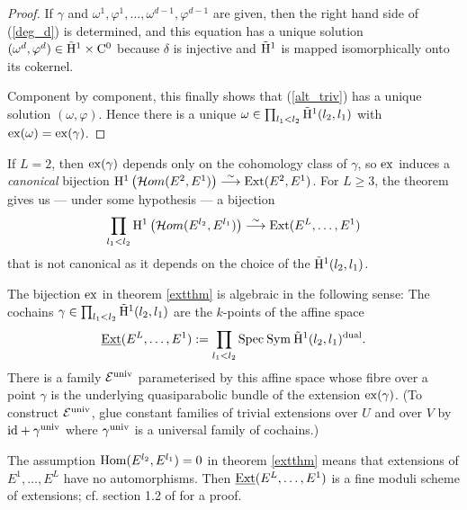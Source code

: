 \documentclass{article}
\begin{document}
\begin{proof}
  If $\gamma$ and $\omega^1, \varphi^1, \ldots, \omega^{d-1}, \varphi^{d-1}$ are given, then the right hand side of (\ref{deg_d}) is determined, and this
  equation has a unique solution $(\omega^d, \varphi^d) \in \tilde{\cohom}^1 \times \chains^0$ because $\delta$ is injective and $\tilde{\cohom}^1$ is
  mapped isomorphically onto its cokernel.

  Component by component, this finally shows that (\ref{alt_triv}) has a unique solution $(\omega, \varphi)$. Hence there is a unique
  $\omega \in \prod_{l_1 < l_2} \tilde{\cohom}^1( l_2, l_1)$ with $\ex(\omega) = \ex(\gamma)$.
\end{proof}

\begin{rem}
  If $L=2$, then $\ex(\gamma)$ depends only on the cohomology class of $\gamma$, so $\ex$ induces a \emph{canonical} bijection $\cohom^1 \left(
  \Homsheaf(E^2, E^1) \right) \longto[\sim] \Ext( E^2, E^1)$. For $L \geq 3$, the theorem gives us --- under some hypothesis --- a bijection
  \begin{displaymath}
    \prod_{l_1 < l_2} \cohom^1 \left( \Homsheaf(E^{l_2}, E^{l_1}) \right) \longto[\sim] \Ext( E^L, \ldots, E^1)
  \end{displaymath}
  that is not canonical as it depends on the choice of the $\tilde{\cohom}^1( l_2, l_1)$. 
\end{rem}

\begin{rem} \label{extspace}
  The bijection $\ex$ in theorem \ref{extthm} is algebraic in the following sense: The cochains $\gamma \in \prod_{l_1 < l_2} \tilde{\cohom}^1( l_2, l_1)$
  are the $k$-points of the affine space
  \begin{displaymath}
    \underline{\Ext}( E^L, \ldots, E^1) := \prod_{l_1 < l_2} \Spec \Sym \tilde{\cohom}^1( l_2, l_1)^{\dual}.
  \end{displaymath}
  There is a family $\E^{\univ}$ parameterised by this affine space whose fibre over a point $\gamma$ is the underlying quasiparabolic bundle of the
  extension $\ex(\gamma)$. (To construct $\E^{\univ}$, glue constant families of trivial extensions over $U$ and over $V$ by $\id + \gamma^{\univ}$ where
  $\gamma^{\univ}$ is a universal family of cochains.)
\end{rem}

\begin{rem}
  The assumption $\Hom( E^{l_2}, E^{l_1}) = 0$ in theorem \ref{extthm} means that extensions of $E^1, \ldots, E^L$ have no automorphisms. Then
  $\underline{\Ext}( E^L, \ldots, E^1)$ is a fine moduli scheme of extensions; cf. section 1.2 of \cite{diss} for a proof.
\end{rem}
\end{document}

